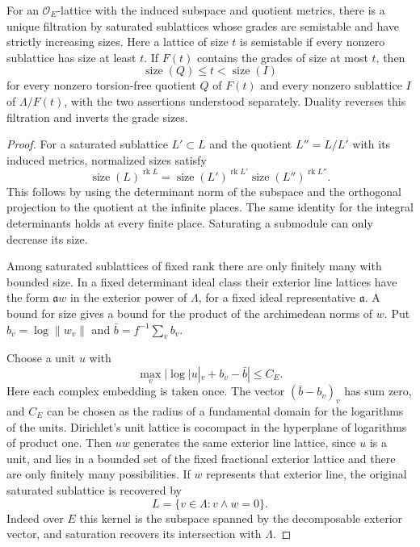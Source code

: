 \begin{auxlemma}
\label{lem:metric-size-filtration}
For an \(\mathcal O_E\)-lattice with the induced subspace and quotient
metrics, there is a unique filtration by saturated sublattices
whose grades are semistable and have strictly increasing sizes.
Here a lattice of size \(t\) is semistable if every nonzero
sublattice has size at least \(t\). If \(F(t)\) contains the grades
of size at most \(t\), then
\[
 \operatorname{size}(Q)\le t < \operatorname{size}(I)
\]
for every nonzero torsion-free quotient \(Q\) of \(F(t)\) and
every nonzero sublattice \(I\) of \(\Lambda/F(t)\), with the two
assertions understood separately. Duality reverses this filtration
and inverts the grade sizes.
\end{auxlemma}
\begin{proof}

For a saturated sublattice \(L'\subset L\) and the quotient
\(L''=L/L'\) with its induced metrics, normalized sizes satisfy
\[
 \operatorname{size}(L)^{\operatorname{rk}L}
 =\operatorname{size}(L')^{\operatorname{rk}L'}
  \operatorname{size}(L'')^{\operatorname{rk}L''}.
\]
This follows by using the determinant norm of the subspace
and the orthogonal projection to the quotient at the
infinite places. The same identity for the integral
determinants holds at every finite place. Saturating a
submodule can only decrease its size.

Among saturated sublattices of fixed rank there are only
finitely many with bounded size. In a fixed determinant ideal
class their exterior line lattices have the form
\(\mathfrak a w\) in the exterior power of \(\Lambda\), for
a fixed ideal representative \(\mathfrak a\). A bound for size
gives a bound for the product of the archimedean norms of \(w\).
Put \(b_v=\log\|w_v\|\) and \(\bar b=f^{-1}\sum_v b_v\).

Choose a unit \(u\) with
\[
     \max_v |\log |u|_v+b_v-\bar b|\le C_E .
\]
Here each complex embedding is taken once. The vector
\((\bar b-b_v)_v\) has sum zero, and \(C_E\) can be chosen as the
radius of a fundamental domain for the logarithms of the units. Dirichlet's unit lattice is
cocompact in the hyperplane of logarithms of product one.
Then \(uw\) generates the same exterior line lattice, since
\(u\) is a unit, and lies in a bounded set of the fixed fractional
exterior lattice and there are only finitely many possibilities.
If \(w\) represents that exterior line, the original
saturated sublattice is recovered by
\[
 L=\{v\in\Lambda:v\wedge w=0\}.
\]
Indeed over \(E\) this kernel is the subspace spanned by the
decomposable exterior vector, and saturation recovers its intersection
with \(\Lambda\).


\end{proof}
